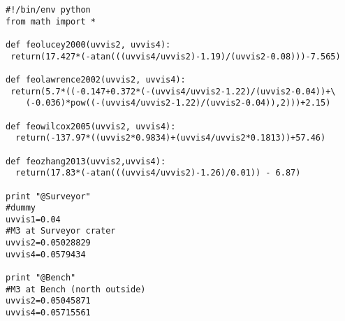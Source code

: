 \documentclass[preview=true]{standalone}
\begin{document}
\begin{verbatim}
#!/bin/env python
from math import *

def feolucey2000(uvvis2, uvvis4):
 return(17.427*(-atan(((uvvis4/uvvis2)-1.19)/(uvvis2-0.08)))-7.565)

def feolawrence2002(uvvis2, uvvis4):
 return(5.7*((-0.147+0.372*(-(uvvis4/uvvis2-1.22)/(uvvis2-0.04))+\
 	(-0.036)*pow((-(uvvis4/uvvis2-1.22)/(uvvis2-0.04)),2)))+2.15)

def feowilcox2005(uvvis2, uvvis4):
  return(-137.97*((uvvis2*0.9834)+(uvvis4/uvvis2*0.1813))+57.46)

def feozhang2013(uvvis2,uvvis4):
  return(17.83*(-atan(((uvvis4/uvvis2)-1.26)/0.01)) - 6.87)

print "@Surveyor"
#dummy
uvvis1=0.04
#M3 at Surveyor crater
uvvis2=0.05028829
uvvis4=0.0579434

print "@Bench"
#M3 at Bench (north outside)
uvvis2=0.05045871
uvvis4=0.05715561
\end{verbatim}
\end{document}

